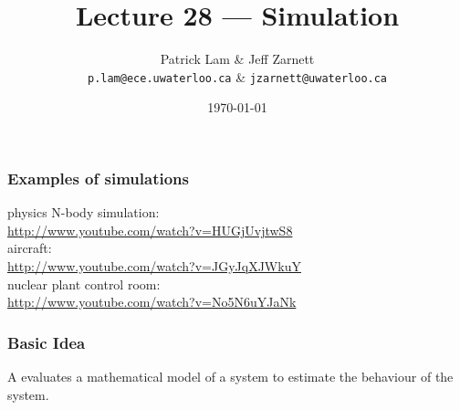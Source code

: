 
\usepackage{tikz-3dplot}

\title{Lecture 28 --- Simulation}

\author{Patrick Lam \& Jeff Zarnett \\ \small \texttt{p.lam@ece.uwaterloo.ca} \& \texttt{jzarnett@uwaterloo.ca}}
\date{\today}



\begin{frame}
  \titlepage
\end{frame}

\begin{frame}
\frametitle{Examples of simulations}

\begin{changemargin}{1cm}
physics N-body simulation:\\
\url{http://www.youtube.com/watch?v=HUGjUvjtwS8} \\[1em]

aircraft:\\
\url{http://www.youtube.com/watch?v=JGyJqXJWkuY} \\[1em]

nuclear plant control room:\\
\url{http://www.youtube.com/watch?v=No5N6uYJaNk} 
\end{changemargin}

\end{frame}

\begin{frame}
\frametitle{Basic Idea}

\begin{changemargin}{1cm}
\huge

A  evaluates a mathematical model of a system
to estimate the behaviour of the system.

\end{changemargin}

\end{frame}

